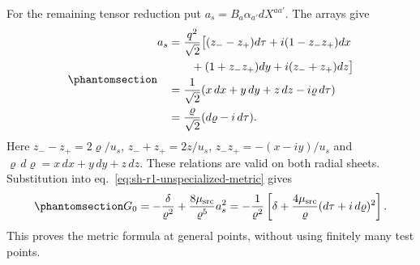 \documentclass[
  english,
  11pt,
  reqno]{amsart}
\begin{document}
For the remaining tensor reduction put \(a_s=B_a\alpha_{a'}dX^{aa'}\).
The arrays give
\begin{equation}\protect\phantomsection\label{eq:sh-r1-null-form}{
 \begin{aligned}
 a_s&=\frac{q^2}{\sqrt2}\bigl[(z_--z_+)d\tau+i(1-z_-z_+)dx\\
 &\qquad+(1+z_-z_+)dy+i(z_-+z_+)dz\bigr]\\
 &=\frac1{\sqrt2}(x\,dx+y\,dy+z\,dz-i\varrho\,d\tau)\\
 &=\frac{\varrho}{\sqrt2}(d\varrho-i\,d\tau).
 \end{aligned}
}\end{equation} Here \(z_--z_+=2\varrho/u_s\), \(z_-+z_+=2z/u_s\),
\(z_-z_+=-(x-iy)/u_s\) and \(\varrho\,d\varrho=x\,dx+y\,dy+z\,dz\).
These relations are valid on both radial sheets. Substitution into
eq.~\ref{eq:sh-r1-unspecialized-metric} gives
\begin{equation}\protect\phantomsection\label{eq:sh-r1-metric-reduction}{
 G_0=-\frac\delta{\varrho^2}+\frac{8\mu_{\rm src}}{\varrho^5}a_s^2
 =-\frac1{\varrho^2}
   \left[\delta+\frac{4\mu_{\rm src}}{\varrho}
                          (d\tau+i\,d\varrho)^2\right].
}\end{equation} This proves the metric formula at general points,
without using finitely many test points.
\end{document}
